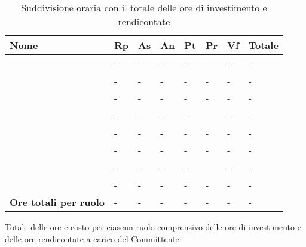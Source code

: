 			\begin{longtable}{ 
				>{\centering}p{} 
				>{\centering}p{}
				>{\centering}p{} 
				>{\centering}p{} 
				>{\centering}p{}
				>{\centering}p{} 
				>{\centering}p{}
				>{\centering\arraybackslash}p{} }
	
				\caption {Suddivisione oraria con il totale delle ore di investimento e rendicontate}		\\
			
				\textbf{\color{white}Nome} & 
				\textbf{\color{white}Rp} & 
				\textbf{\color{white}As} & 
				\textbf{\color{white}An} &
				\textbf{\color{white}Pt} &
				\textbf{\color{white}Pr} &
				\textbf{\color{white}Vf} &
				\textbf{\color{white}Totale}
				\tabularnewline  
				\endhead
			
				\VB & - & - & - & - & - & - & - \\
				\LB & - & - & - & - & - & - & - \\
				\NF & - & - & - & - & - & - & - \\
				\EG & - & - & - & - & - & - & - \\
				\FJ & - & - & - & - & - & - & - \\
				\MP & - & - & - & - & - & - & - \\
				\AS & - & - & - & - & - & - & - \\
				\AZ & - & - & - & - & - & - & - \\
				\textbf{Ore totali per ruolo} & - & - & - & - & - & - & - \\
			\end{longtable}
			
			
			Totale delle ore e costo per ciascun ruolo comprensivo delle ore di investimento e delle ore rendicontate a carico del Committente:
		
